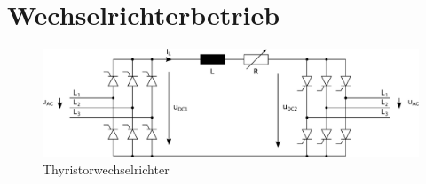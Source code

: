 \section{Wechselrichterbetrieb}

\begin{figure}[h!]
    \centering
    \includegraphics[scale=\sscale]{./../fig/b6_thyristor_wr.pdf}
    \caption{Thyristorwechselrichter}
    \label{fig:b6_thyristor_wr}
\end{figure}
